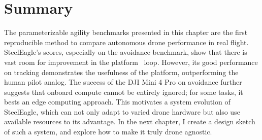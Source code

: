 \section{Summary}
The parameterizable agility benchmarks presented in this chapter are the first reproducible method to compare autonomous drone performance in real flight. SteelEagle's scores, especially on the avoidance benchmark, show that there is vast room for improvement in the platform \ooda~loop. However, its good performance on tracking demonstrates the usefulness of the platform, outperforming the human pilot analog. The success of the DJI Mini 4 Pro on avoidance further suggests that onboard compute cannot be entirely ignored; for some tasks, it bests an edge computing approach. This motivates a system evolution of SteelEagle, which can not only adapt to varied drone hardware but also use available resources to its advantage. In the next chapter, I create a design sketch of such a system, and explore how to make it truly drone agnostic.